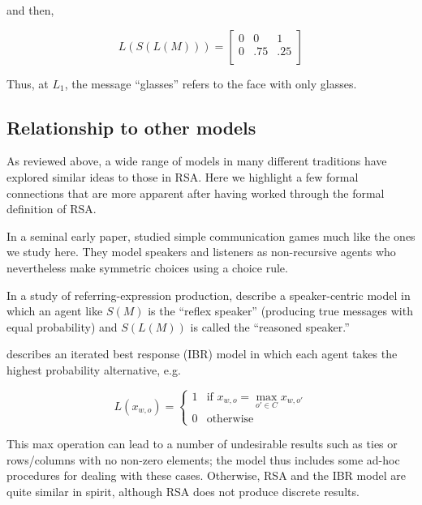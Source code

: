 and then,


\begin{equation}
L(S(L(M))) = \left[
    \begin{array}{ccc}
      0 & 0 & 1 \\
      0 & .75 & .25\\
    \end{array} 
  \right]
\end{equation}

\noindent Thus, at $L_1$, the message ``glasses'' refers to the face with only glasses.

\subsection{Relationship to other models}

As reviewed above, a wide range of models in many different traditions have explored similar ideas to those in RSA. Here we highlight a few formal connections that are more apparent after having worked through the formal definition of RSA.

In a seminal early paper,  studied simple communication games much like the ones we study here. They model speakers and listeners as non-recursive agents who nevertheless make symmetric choices using a  choice rule. 

In a study of referring-expression production,  describe a speaker-centric model in which an agent like $S(M)$ is the ``reflex speaker'' (producing true messages with equal probability) and $S(L(M))$ is called the ``reasoned speaker.'' 

 describes an iterated best response (IBR) model in which each agent takes the highest probability alternative, e.g. 

\begin{equation}
L(x_{w,o}) = \begin{cases} 
1 &\mbox{if } x_{w,o} = \max_{o' \in C}{x_{w,o'}}  \\
0 &\mbox{otherwise}
\end{cases}
\end{equation}

\noindent This max operation can lead to a number of undesirable results such as ties or rows/columns with no non-zero elements; the model thus includes some ad-hoc procedures for dealing with these cases. Otherwise, RSA and the IBR model are quite similar in spirit, although RSA does not produce discrete results. 

